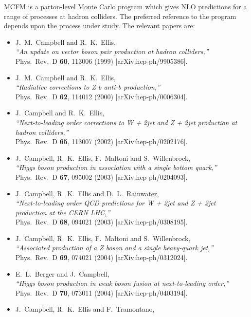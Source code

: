 \documentclass[12pt]{article}
\begin{document}
MCFM is a parton-level Monte Carlo program which gives NLO predictions
for a range of processes at hadron colliders. The preferred reference
to the program depends upon the process under study. The relevant papers
are:
\begin{itemize}
\item J.~M.~Campbell and R.~K.~Ellis, \\
  {\it ``An update on vector boson pair production at hadron colliders,''} \\
  Phys.\ Rev.\ D {\bf 60}, 113006 (1999)
  [arXiv:hep-ph/9905386].
\item J.~M.~Campbell and R.~K.~Ellis, \\
  {\it ``Radiative corrections to Z b anti-b production,''} \\
  Phys.\ Rev.\ D {\bf 62}, 114012 (2000)
  [arXiv:hep-ph/0006304].
\item J.~Campbell and R.~K.~Ellis, \\
  {\it ``Next-to-leading order corrections to W + 2jet and Z + 2jet production  at
   hadron colliders,''} \\
  Phys.\ Rev.\ D {\bf 65}, 113007 (2002)
  [arXiv:hep-ph/0202176].
\item J.~Campbell, R.~K.~Ellis, F.~Maltoni and S.~Willenbrock, \\
  {\it ``Higgs boson production in association with a single bottom quark,''} \\
  Phys.\ Rev.\ D {\bf 67}, 095002 (2003)
  [arXiv:hep-ph/0204093].
\item J.~Campbell, R.~K.~Ellis and D.~L.~Rainwater, \\
  {\it ``Next-to-leading order QCD predictions for W + 2jet and Z + 2jet  production
     at the CERN LHC,''} \\
  Phys.\ Rev.\ D {\bf 68}, 094021 (2003)
  [arXiv:hep-ph/0308195].
\item J.~Campbell, R.~K.~Ellis, F.~Maltoni and S.~Willenbrock, \\
  {\it ``Associated production of a Z boson and a single heavy-quark jet,''} \\
  Phys.\ Rev.\ D {\bf 69}, 074021 (2004)
  [arXiv:hep-ph/0312024].
\item E.~L.~Berger and J.~Campbell, \\
  {\it ``Higgs boson production in weak boson fusion at next-to-leading order,''} \\
  Phys.\ Rev.\ D {\bf 70}, 073011 (2004)
  [arXiv:hep-ph/0403194].
\item J.~Campbell, R.~K.~Ellis and F.~Tramontano, \\

\end{itemize}
\end{document}

